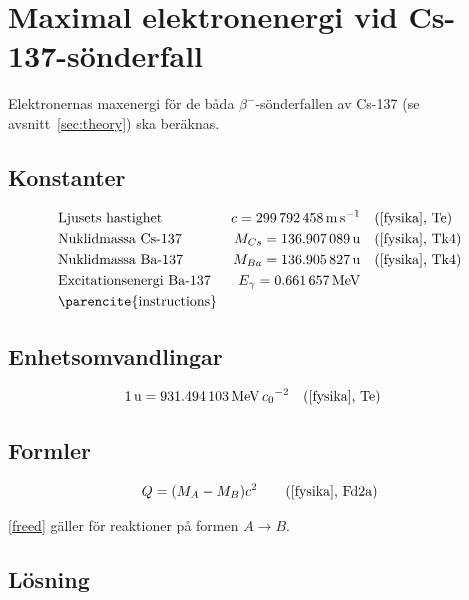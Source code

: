 \section{Maximal elektronenergi vid Cs-137-sönderfall} \label{sec:energy}

Elektronernas maxenergi för de båda $\beta^-$-sönderfallen av Cs-137 (se
avsnitt~\ref{sec:theory}) ska beräknas.

\subsection*{Konstanter}

\begin{align*}
    & \text{Ljusets hastighet}        & c        = \qty{299792458}{\m\per\s}         &\quad \fysika{Te}     \\
    & \text{Nuklidmassa Cs-137}       & M_{Cs}   = \qty{136.907089}{\atomicmassunit} &\quad \fysika{Tk4}    \\
    & \text{Nuklidmassa Ba-137}       & M_{Ba}   = \qty{136.905827}{\atomicmassunit} &\quad \fysika{Tk4}    \\
    & \text{Excitationsenergi Ba-137} & E_\gamma = \qty{0.661657}{\MeV} \\ &\text{\parencite{instructions}} \\
\end{align*}

\subsection*{Enhetsomvandlingar}

\begin{align*}
    & \qty{1}{\atomicmassunit} = \qty{931.494103}{\MeV\per\clight\squared} \quad \fysika{Te}
\end{align*}

\subsection*{Formler}

\begin{align}
    Q &= (M_A - M_B)c^2 &\quad \fysika{Fd2a} \label{freed}
\end{align}

\eqref{freed} gäller för reaktioner på formen $A \longrightarrow B$.

\subsection*{Lösning}

